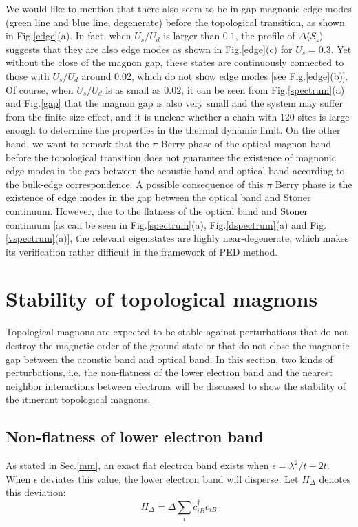 \documentclass[amsmath,superscriptaddress,showpacs,aps,prb,twocolumn]{revtex4-1}
\begin{document}
\par We would like to mention that there also seem to be in-gap magnonic edge modes (green line and blue line, degenerate) before the topological transition, as shown in Fig.\ref{edge}(a). In fact, when $U_s/U_d$ is larger than $0.1$, the profile of $\Delta\langle S_z\rangle$ suggests that they are also edge modes as shown in Fig.\ref{edge}(c) for $U_s=0.3$. Yet without the close of the magnon gap, these states are continuously connected to those with $U_s/U_d$ around $0.02$, which do not show edge modes [see Fig.\ref{edge}(b)]. Of course, when $U_s/U_d$ is as small as $0.02$, it can be seen from Fig.\ref{spectrum}(a) and Fig.\ref{gap} that the magnon gap is also very small and the system may suffer from the finite-size effect, and it is unclear whether a chain with $120$ sites is large enough to determine the properties in the thermal dynamic limit. On the other hand, we want to remark that the $\pi$ Berry phase of the optical magnon band before the topological transition does not guarantee the existence of magnonic edge modes in the gap between the acoustic band and optical band according to the bulk-edge correspondence. A possible consequence of this $\pi$ Berry phase is the existence of edge modes in the gap between the optical band and Stoner continuum. However, due to the flatness of the optical band and Stoner continuum [as can be seen in Fig.\ref{spectrum}(a), Fig.\ref{dspectrum}(a) and Fig.\ref{vspectrum}(a)], the relevant eigenstates are highly near-degenerate, which makes its verification rather difficult in the framework of PED method.

\section{Stability of topological magnons}\label{stm}
\par Topological magnons are expected to be stable against perturbations that do not destroy the magnetic order of the ground state or that do not close the magnonic gap between the acoustic band and optical band. In this section, two kinds of perturbations, i.e. the non-flatness of the lower electron band and the nearest neighbor interactions between electrons will be discussed to show the stability of the itinerant topological magnons.

\subsection{Non-flatness of lower electron band}
\par As stated in Sec.\ref{mm}, an exact flat electron band exists when $\epsilon=\lambda^2/t-2t$. When $\epsilon$ deviates this value, the lower electron band will disperse. Let $H_\Delta$ denotes this deviation:
\begin{equation}\label{delta}
H_{\Delta}=\Delta\sum_ic_{iB}^\dagger c_{iB}
\end{equation}
\end{document}
